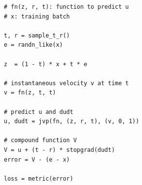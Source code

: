 



\newcommand{\safeColorbox}[2]{%
  \begingroup
  \setlength{\fboxsep}{0pt}%
  \colorbox{#1}{\strut #2}%
  \endgroup
}

\begin{algorithm}[t]
\centering
\caption{{improved MeanFlow}: training.\\
{\scriptsize Note: in PyTorch and JAX, \texttt{jvp} returns the function output and JVP.}}
\label{alg:code}
\begin{minipage}{0.98\linewidth}
\begin{lstlisting}[language=PythonFuncColor, escapechar=`]
# fn(z, r, t): function to predict u
# x: training batch

t, r = sample_t_r()
e = randn_like(x)

z  = (1 - t) * x + t * e

# instantaneous velocity v at time t
v = fn(z, t, t)

# predict u and dudt
u, dudt = jvp(fn, (z, r, t), (v, 0, 1))

# compound function V
V = u + (t - r) * stopgrad(dudt)
error = V - (e - x)

loss = metric(error)
\end{lstlisting}
\end{minipage}
\end{algorithm}
